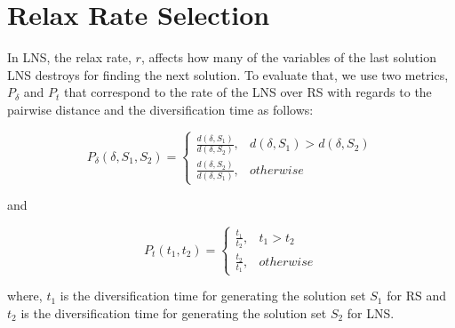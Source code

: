 \documentclass{article}
\begin{document}
\section*{Relax Rate Selection}
\label{sec:relax_rate_selection}

In \ac{LNS}, the relax rate, $r$, affects
how many of the variables of the last solution
\ac{LNS} destroys for finding the next solution.
To evaluate that, we use two metrics, $P_{\delta}$ and $P_{t}$
that correspond to the rate of the \ac{LNS} over \ac{RS} with regards
to the pairwise distance and the diversification time as follows:

\begin{equation}
  P_{\delta}(\delta, S_1, S_2) = \begin{cases}
    \displaystyle \frac{d(\delta, S_1)}{d(\delta, S_2)},& d(\delta, S_1) > d(\delta, S_2) \\
    \displaystyle \frac{d(\delta, S_2)}{d(\delta, S_1)},& otherwise
    \end{cases}
    \label{eq:impr}
\end{equation}

\noindent
and

\begin{equation}
  P_{t}(t_1, t_2) = \begin{cases}
    \displaystyle \frac{t_1}{t_2},& t_1> t_2\\
    \displaystyle \frac{t_2}{t_1},& otherwise
    \end{cases}
    \label{eq:imprt}
\end{equation}

\noindent
where, $t_1$ is the diversification time for generating the solution set $S_1$ for \ac{RS}
and $t_2$ is the diversification time for generating the solution set $S_2$ for \ac{LNS}.
\end{document}
